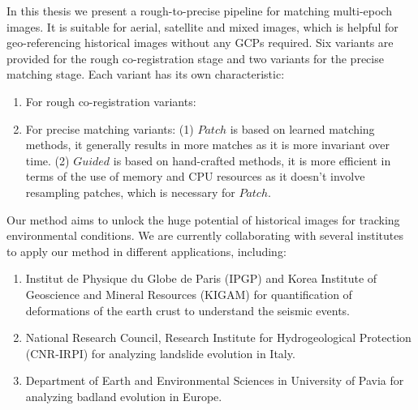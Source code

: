 In this thesis we present a rough-to-precise pipeline for matching multi-epoch images. It is suitable for aerial, satellite and mixed images, which is helpful for geo-referencing historical images without any \ac{GCP}s required. Six variants are provided for the rough co-registration stage and two variants for the precise matching stage. Each variant has its own characteristic:\\
\begin{enumerate}
	\item For rough co-registration variants: 
	\item For precise matching variants: (1) $Patch$ is based on learned matching methods, it generally results in more matches as it is more invariant over time. (2) $Guided$ is based on hand-crafted methods, it is more efficient in terms of the use of memory and CPU resources as it doesn't involve resampling patches, which is necessary for $Patch$. %
\end{enumerate}
\par
Our method aims to unlock the huge potential of historical images for tracking environmental conditions.
We are currently collaborating with several institutes to apply our method in different applications, including:
\begin{enumerate}
	\item Institut de Physique du Globe de Paris (IPGP) and Korea Institute of Geoscience and Mineral Resources (KIGAM) for quantification of deformations of the earth crust to understand the seismic events.
	\item National Research Council, Research Institute for Hydrogeological Protection (CNR-IRPI) for analyzing landslide evolution in Italy.
	\item Department of Earth and Environmental Sciences in University of Pavia for analyzing badland evolution in Europe.
\end{enumerate}
